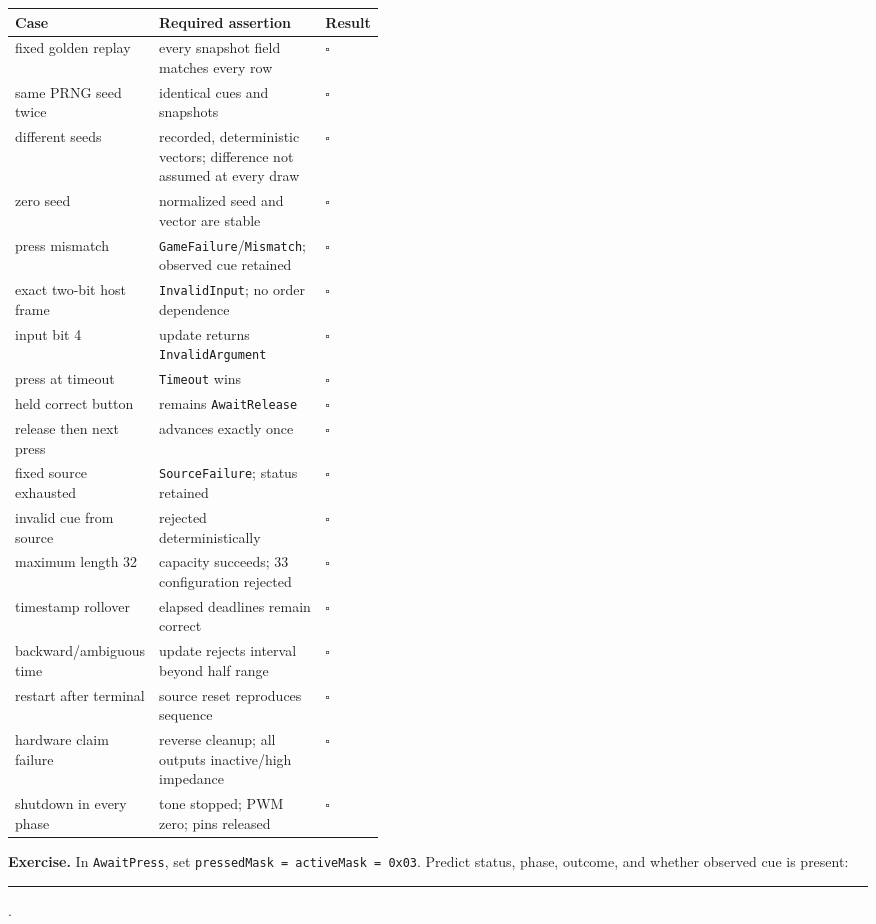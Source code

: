 \documentclass[11pt]{article}
\newcommand{\checkbox}{\(\square\)}
\newcommand{\blank}[1]{\rule{#1}{0.4pt}}
\begin{document}
\begin{tabularx}{\linewidth}{@{}p{0.29\linewidth}X p{0.14\linewidth}@{}}
\toprule
Case & Required assertion & Result\\
\midrule
fixed golden replay & every snapshot field matches every row & \checkbox{}\\
same PRNG seed twice & identical cues and snapshots & \checkbox{}\\
different seeds & recorded, deterministic vectors; difference not assumed at every draw & \checkbox{}\\
zero seed & normalized seed and vector are stable & \checkbox{}\\
press mismatch & \texttt{GameFailure}/\texttt{Mismatch}; observed cue retained & \checkbox{}\\
exact two-bit host frame & \texttt{InvalidInput}; no order dependence & \checkbox{}\\
input bit 4 & update returns \texttt{InvalidArgument} & \checkbox{}\\
press at timeout & \texttt{Timeout} wins & \checkbox{}\\
held correct button & remains \texttt{AwaitRelease} & \checkbox{}\\
release then next press & advances exactly once & \checkbox{}\\
fixed source exhausted & \texttt{SourceFailure}; status retained & \checkbox{}\\
invalid cue from source & rejected deterministically & \checkbox{}\\
maximum length 32 & capacity succeeds; 33 configuration rejected & \checkbox{}\\
timestamp rollover & elapsed deadlines remain correct & \checkbox{}\\
backward/ambiguous time & update rejects interval beyond half range & \checkbox{}\\
restart after terminal & source reset reproduces sequence & \checkbox{}\\
hardware claim failure & reverse cleanup; all outputs inactive/high impedance & \checkbox{}\\
shutdown in every phase & tone stopped; PWM zero; pins released & \checkbox{}\\
\bottomrule
\end{tabularx}

\textbf{Exercise.} In \texttt{AwaitPress}, set
\texttt{pressedMask = activeMask = 0x03}. Predict status, phase, outcome, and
whether observed cue is present: \blank{4.5in}.
\end{document}
